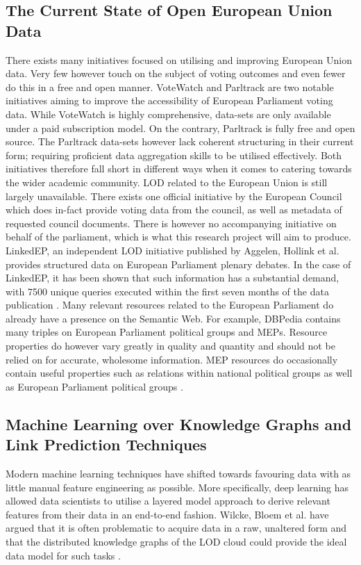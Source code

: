 \documentclass{article}
\begin{document}
\subsection{The Current State of Open European Union Data}
\label{backgroundData}
There exists many initiatives focused on utilising and improving European Union data. Very few however touch on the subject of voting outcomes and even fewer do this in a free and open manner. VoteWatch \cite{votewatch} and Parltrack \cite{parltrack} are two notable initiatives aiming to improve the accessibility of European Parliament voting data. While VoteWatch is highly comprehensive, data-sets are only available under a paid subscription model. On the contrary, Parltrack is fully free and open source. The Parltrack data-sets however lack coherent structuring in their current form; requiring proficient data aggregation skills to be utilised effectively. Both initiatives therefore fall short in different ways when it comes to catering towards the wider academic community.
\newline
LOD related to the European Union is still largely unavailable. There exists one official initiative by the European Council \cite{EUCouncilLOD} which does in-fact provide voting data from the council, as well as metadata of requested council documents. There is however no accompanying initiative on behalf of the parliament, which is what this research project will aim to produce. LinkedEP, an independent LOD initiative published by Aggelen, Hollink et al. \cite{LinkedPolitics} provides structured data on European Parliament plenary debates. In the case of LinkedEP, it has been shown that such information has a substantial demand, with 7500 unique queries executed within the first seven months of the data publication \cite{Aggelen2017TheDO}.
\newline
Many relevant resources related to the European Parliament do already have a presence on the Semantic Web. For example, DBPedia contains many triples on European Parliament political groups and MEPs. Resource properties do however vary greatly in quality and quantity and should not be relied on for accurate, wholesome information. MEP resources do occasionally contain useful properties such as relations within national political groups as well as European Parliament political groups \cite{DBPediaExample}.

\subsection{Machine Learning over Knowledge Graphs and Link Prediction Techniques}
\label{backgroundPrediction}
Modern machine learning techniques have shifted towards favouring data with as little manual feature engineering as possible. More specifically, deep learning has allowed data scientists to utilise a layered model approach to derive relevant features from their data in an end-to-end fashion. Wilcke, Bloem et al. have argued that it is often problematic to acquire data in a raw, unaltered form and that the distributed knowledge graphs of the LOD cloud could provide the ideal data model for such tasks \cite{Wilcke2017}.
\end{document}
